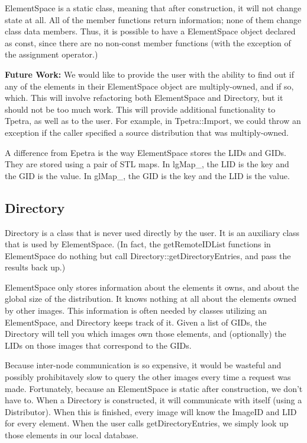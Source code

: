 \documentclass[10pt,relax]{TpetraDesign}
\begin{document}
ElementSpace is a static class, meaning that after construction, it will not change state at all. All of the member functions return information; none of them change class data members. Thus, it is possible to have a ElementSpace object declared as const, since there are no non-const member functions (with the exception of the assignment operator.)

\textbf{Future Work:} We would like to provide the user with the ability to find out if any of the elements in their ElementSpace object are multiply-owned, and if so, which. This will involve refactoring both ElementSpace and Directory, but it should not be too much work. This will provide additional functionality to Tpetra, as well as to the user. For example, in Tpetra::Import, we could throw an exception if the caller specified a source distribution that was multiply-owned.

A difference from Epetra is the way ElementSpace stores the LIDs and GIDs. They are stored using a pair of STL maps. In lgMap\_, the LID is the key and the GID is the value. In glMap\_, the GID is the key and the LID is the value.

%
\subsection{Directory}
Directory is a class that is never used directly by the user. It is an auxiliary class that is used by ElementSpace. (In fact, the getRemoteIDList functions in ElementSpace do nothing but call Directory::getDirectoryEntries, and pass the results back up.)

ElementSpace only stores information about the elements it owns, and about the global size of the distribution. It knows nothing at all about the elements owned by other images. This information is often needed by classes utilizing an ElementSpace, and Directory keeps track of it. Given a list of GIDs, the Directory will tell you which images own those elements, and (optionally) the LIDs on those images that correspond to the GIDs. 

Because inter-node communication is so expensive, it would be wasteful and possibly prohibitavely slow to query the other images every time a request was made. Fortunately, because an ElementSpace is static after construction, we don't have to. When a Directory is constructed, it will communicate with itself (using a Distributor). When this is finished, every image will know the ImageID and LID for every element. When the user calls getDirectoryEntries, we simply look up those elements in our local database.
\end{document}
